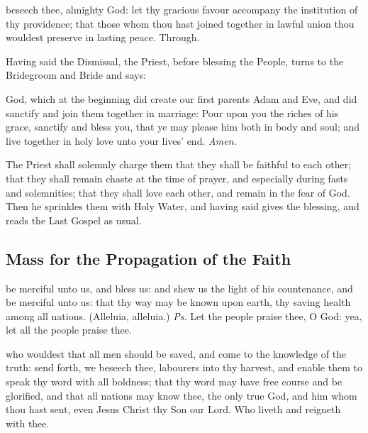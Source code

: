 \postcommunion
{} beseech thee, almighty God: let thy gracious favour accompany the institution of thy providence; that those whom thou hast joined together in lawful union thou wouldest preserve in lasting peace. Through.

\clearpage
\begin{rubric}
    Having said the Dismissal, the Priest, before blessing the People, turns to the Bridegroom and Bride and says:
\end{rubric}
 God, which at the beginning did create our first parents Adam and Eve, and did sanctify and join them together in marriage: Pour upon you the riches of his grace, sanctify and {} bless you, that ye may please him both in body and soul; and live together in holy love unto your lives' end. \textit{Amen.}
\begin{rubric}
    The Priest shall solemnly charge them that they shall be faithful to each other; that they shall remain chaste at the time of prayer, and especially during fasts and solemnities; that they shall love each other, and remain in the fear of God. Then he sprinkles them with Holy Water, and having said  gives the blessing, and reads the Last Gospel as usual.
\end{rubric}


\subsection{Mass for the Propagation of the Faith}

\introit
{} be merciful unto us, and bless us: and shew us the light of his countenance, and be merciful unto us: that thy way may be known upon earth, thy saving health among all nations. (Alleluia, alleluia.) \textit{Ps.} Let the people praise thee, O God: yea, let all the people praise thee.

\collect
{} who wouldest that all men should be saved, and come to the knowledge of the truth: send forth, we beseech thee, labourers into thy harvest, and enable them to speak thy word with all boldness; that thy word may have free course and be glorified, and that all nations may know thee, the only true God, and him whom thou hast sent, even Jesus Christ thy Son our Lord. Who liveth and reigneth with thee.

